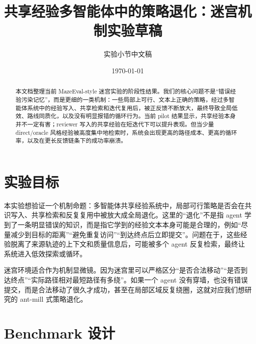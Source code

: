 \documentclass[UTF8,11pt]{ctexart}
\title{共享经验多智能体中的策略退化：迷宫机制实验草稿}
\author{实验小节中文稿}
\date{\today}
\begin{document}
\maketitle

\begin{center}
\end{center}

\begin{abstract}
本文档整理当前 MazeEval-style 迷宫实验的阶段性结果。我们的核心问题不是“错误经验污染记忆”，而是更细的一类机制：一些局部上可行、文本上正确的策略，经过多智能体系统中的经验写入、共享检索和迭代复用后，被正反馈不断放大，最终导致全局低效、路线同质化，以及没有明显报错的循环行为。当前 pilot 结果显示，共享经验本身并不一定有害；reviewer 写入的共享经验在短迭代下可以提升表现。但当少量 direct/oracle 风格经验被高度集中地检索时，系统会出现更高的路径成本、更高的循环率，以及在更长反馈链条下的成功率崩溃。
\end{abstract}

\section{实验目标}

本实验想验证一个机制命题：多智能体共享经验系统中，局部可行策略是否会在共识写入、共享检索和反复复用中被放大成全局退化。这里的“退化”不是指 agent 学到了一条明显错误的知识，而是指它学到的经验文本本身可能是合理的，例如“尽量减少到目标的距离”“避免重复访问”“到达终点后立即提交”。问题在于，这些经验脱离了来源轨迹的上下文和质量信息后，可能被多个 agent 反复检索，最终让系统进入低效探索或循环。

迷宫环境适合作为机制显微镜。因为迷宫里可以严格区分“是否合法移动”“是否到达终点”“实际路径相对最短路径有多绕”。如果一个 agent 没有穿墙，也没有错误提交，而是合法移动了很久才成功，甚至在局部区域反复绕圈，这就对应我们想研究的 ant-mill 式策略退化。

\section{Benchmark 设计}
\end{document}
